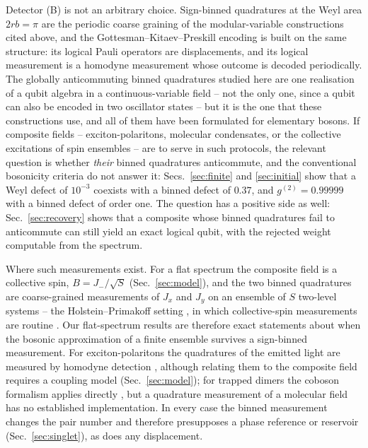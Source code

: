 \documentclass[11pt,a4paper]{article}
\begin{document}
Detector (B) is not an arbitrary choice. Sign-binned quadratures at the Weyl area $2rb=\pi$ are the periodic coarse graining of the modular-variable constructions cited above, and the Gottesman--Kitaev--Preskill encoding \cite{GKP2001} is built on the same structure: its logical Pauli operators are displacements, and its logical measurement is a homodyne measurement whose outcome is decoded periodically. The globally anticommuting binned quadratures studied here are one realisation of a qubit algebra in a continuous-variable field -- not the only one, since a qubit can also be encoded in two oscillator states -- but it is the one that these constructions use, and all of them have been formulated for elementary bosons. If composite fields -- exciton-polaritons, molecular condensates, or the collective excitations of spin ensembles -- are to serve in such protocols, the relevant question is whether \emph{their} binned quadratures anticommute, and the conventional bosonicity criteria do not answer it: Secs.~\ref{sec:finite} and \ref{sec:initial} show that a Weyl defect of $10^{-3}$ coexists with a binned defect of $0.37$, and $g^{(2)}=0.99999$ with a binned defect of order one. The question has a positive side as well: Sec.~\ref{sec:recovery} shows that a composite whose binned quadratures fail to anticommute can still yield an exact logical qubit, with the rejected weight computable from the spectrum.

Where such measurements exist. For a flat spectrum the composite field is a collective spin, $B=J_-/\sqrt S$ (Sec.~\ref{sec:model}), and the two binned quadratures are coarse-grained measurements of $J_x$ and $J_y$ on an ensemble of $S$ two-level systems -- the Holstein--Primakoff setting \cite{HolsteinPrimakoff1940}, in which collective-spin measurements are routine \cite{Ma2011}. Our flat-spectrum results are therefore exact statements about when the bosonic approximation of a finite ensemble survives a sign-binned measurement. For exciton-polaritons the quadratures of the emitted light are measured by homodyne detection \cite{Deng2010}, although relating them to the composite field requires a coupling model (Sec.~\ref{sec:model}); for trapped dimers the coboson formalism applies directly \cite{Jimenez2023}, but a quadrature measurement of a molecular field has no established implementation. In every case the binned measurement changes the pair number and therefore presupposes a phase reference or reservoir (Sec.~\ref{sec:singlet}), as does any displacement.
\end{document}
